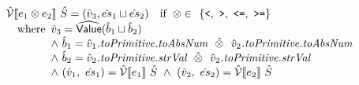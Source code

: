 \[\begin{array}{l}
\aV \lbr e_1 \inop e_2 \rbr\ \hat{S} = (\hat{v}_3, \hat{es}_1 \sqcup \hat{es}_2)
\quad\ifc{\inop \in } \left\{ \verb+<+ ,\ \verb+>+ ,\ \verb+<=+ ,\ \verb+>=+ \right\}\\
\quad\wherec{
\hat{v}_3 = \abs{Value}(\hat{b}_1 \sqcup \hat{b}_2) \\
\land\ \hat{b}_1 = \hat{v}_1\emph{.toPrimitive.toAbsNum} ~~\hat{\inop}~~ \hat{v}_2\emph{.toPrimitive.toAbsNum} \\
\land\ \hat{b}_2 = \hat{v}_2\emph{.toPrimitive.strVal} ~~\hat{\inop}~~ \hat{v}_2\emph{.toPrimitive.strVal} \\
\land\ (\hat{v}_1,\ \hat{es}_1) = \aV \lbr e_1 \rbr\ \hat{S} \
\land\ (\hat{v}_2,\ \hat{es}_2) = \aV \lbr e_2 \rbr\ \hat{S}
}\\\\


\end{array}
\]

